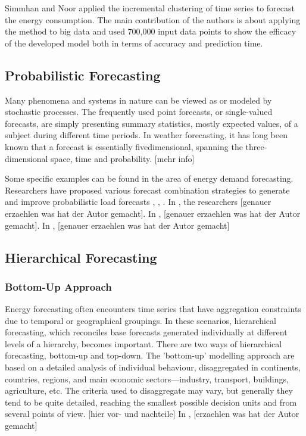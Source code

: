 \documentclass[lettersize,journal]{IEEEtran}
\begin{document}
Simmhan and Noor \cite{time series clustering} applied the incremental clustering of time series to forecast the energy consumption. The main contribution of the authors is about applying the method to big data and used 700,000 input data points to show the efficacy of the developed model both in terms of accuracy and prediction time. 

  \subsection{Probabilistic Forecasting}
  Many phenomena and systems in nature can be viewed as or modeled by stochastic processes. The frequently used point forecasts, or single-valued forecasts, are simply presenting summary statistics, mostly expected values, of a subject during different time periods. In weather forecasting, it has long been known that a forecast is essentially fivedimensional, spanning the three-dimensional space, time and probability. [mehr info] 

  Some specific examples can be found in the area of energy demand forecasting. Researchers have proposed various forecast combination strategies to generate and improve probabilistic load forecasts \cite{37}, \cite{76}, \cite{77}. In \cite{37}, the researchers [genauer erzaehlen was hat der Autor gemacht]. In \cite{76}, [genauer erzaehlen was hat der Autor gemacht]. In \cite{77}, [genauer erzaehlen was hat der Autor gemacht]

  \subsection{Hierarchical Forecasting}
  
    \subsubsection{Bottom-Up Approach}
  Energy forecasting often encounters time series that have aggregation constraints due to temporal or geographical groupings. In these scenarios, hierarchical forecasting, which reconciles base forecasts generated individually at different levels of a hierarchy, becomes important. There are two ways of hierarchical forecasting, bottom-up and top-down. The 'bottom-up' modelling approach are based on a detailed analysis of individual behaviour, disaggregated in continents, countries, regions, and main economic sectors—industry, transport, buildings, agriculture, etc. The criteria used to disaggregate may vary, but generally they tend to be quite detailed, reaching the smallest possible decision units and from several points of view. [hier vor- und nachteile]  In \cite{9}, [erzaehlen was hat der Autor gemacht]
\end{document}
